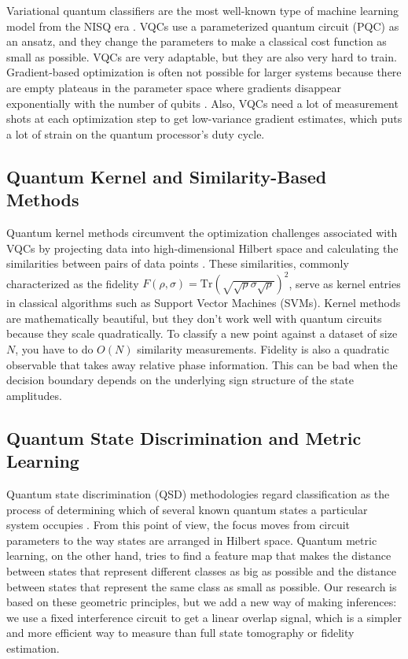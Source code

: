 \documentclass[conference]{IEEEtran}
\begin{document}
Variational quantum classifiers are the most well-known type of machine learning model from the NISQ era \cite{benedetti2019parameterized,abbas2021power}. VQCs use a parameterized quantum circuit (PQC) as an ansatz, and they change the parameters to make a classical cost function as small as possible. VQCs are very adaptable, but they are also very hard to train. Gradient-based optimization is often not possible for larger systems because there are empty plateaus in the parameter space where gradients disappear exponentially with the number of qubits \cite{mcclean2018barren}. Also, VQCs need a lot of measurement shots at each optimization step to get low-variance gradient estimates, which puts a lot of strain on the quantum processor's duty cycle.

\subsection{Quantum Kernel and Similarity-Based Methods}

Quantum kernel methods circumvent the optimization challenges associated with VQCs by projecting data into high-dimensional Hilbert space and calculating the similarities between pairs of data points \cite{schuld2019feature,havlicek2019supervised}. These similarities, commonly characterized as the fidelity $F(\rho, \sigma) = \text{Tr}(\sqrt{\sqrt{\rho}\sigma\sqrt{\rho}})^2$, serve as kernel entries in classical algorithms such as Support Vector Machines (SVMs). Kernel methods are mathematically beautiful, but they don't work well with quantum circuits because they scale quadratically. To classify a new point against a dataset of size $N$, you have to do $O(N)$ similarity measurements. Fidelity is also a quadratic observable that takes away relative phase information. This can be bad when the decision boundary depends on the underlying sign structure of the state amplitudes.

\subsection{Quantum State Discrimination and Metric Learning}

Quantum state discrimination (QSD) methodologies regard classification as the process of determining which of several known quantum states a particular system occupies \cite{sergioli2019binary,gonzalez2021classification}. From this point of view, the focus moves from circuit parameters to the way states are arranged in Hilbert space. Quantum metric learning, on the other hand, tries to find a feature map that makes the distance between states that represent different classes as big as possible and the distance between states that represent the same class as small as possible. Our research is based on these geometric principles, but we add a new way of making inferences: we use a fixed interference circuit to get a linear overlap signal, which is a simpler and more efficient way to measure than full state tomography or fidelity estimation.
\end{document}
